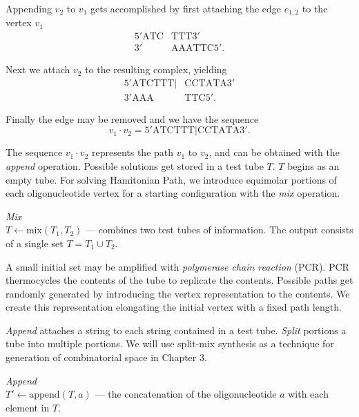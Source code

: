 \noindent Appending $v_2$ to $v_1$ gets accomplished by first attaching the edge $e_{1,2}$ to the vertex $v_1$
\begin{align*}
 5'\text{ATC}&\text{TTT}3' \\
  3'&\text{AAATTC}5'.
\end{align*}

\noindent Next we attach $v_2$ to the resulting complex, yielding
\begin{align*}
 5'\text{ATCTTT}|&\text{CCTATA}3'\\
  3'\text{AAA}&\text{TTC}5'.
\end{align*}

\noindent Finally the edge may be removed and we have the sequence
\[
v_1 \cdot v_2 = 5'\text{ATCTTT}|\text{CCTATA}3'.
\]

The sequence $v_1 \cdot v_2$ represents the path $v_1$ to $v_2$, and can be obtained with the \textit{append} operation.  Possible solutions get stored in a test tube $T$.  $T$ begins as an empty tube.  For solving {\sc Hamitonian Path}, we introduce equimolar portions of each oligonucleotide vertex for a starting configuration with the \textit{mix} operation.

\begin{definition}
\textit{Mix}\\
$ T \leftarrow \text{mix}( T_1, T_2)$ --- combines two test tubes of information.  The output consists of a single set $T = T_1 \cup T_2$.
\end{definition}

A small initial set may be amplified with \textit{polymerase chain reaction} (PCR).  PCR thermocycles the contents of the tube to replicate the contents. Possible paths get randomly generated by introducing the vertex representation to the contents.  We create this representation elongating the initial vertex with a fixed path length.

\textit{Append} attaches a string to each string contained in a test tube.  \textit{Split} portions a tube into multiple portions.  We will use split-mix synthesis as a technique for generation of combinatorial space in Chapter 3.

\begin{definition}
\textit{Append}\\
$T' \leftarrow \text{append}( T, a)$ --- the concatenation of the oligonucleotide $a$ with each element in $T$.  
\end{definition}

